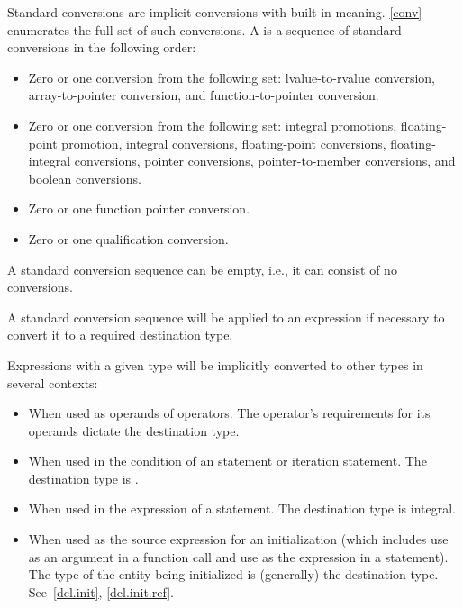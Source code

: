 \pnum
{}%
%
Standard conversions are implicit conversions with built-in meaning.
\ref{conv} enumerates the full set of such conversions. A
 is a sequence of standard
conversions in the following order:
\begin{itemize}
\item Zero or one conversion from the following set: lvalue-to-rvalue
conversion, array-to-pointer conversion, and function-to-pointer
conversion.

\item Zero or one conversion from the following set: integral
promotions, floating-point promotion, integral conversions, floating-point
conversions, floating-integral conversions, pointer conversions,
pointer-to-member conversions, and boolean conversions.

\item Zero or one function pointer conversion.

\item Zero or one qualification conversion.
\end{itemize}

\begin{note}
A standard conversion sequence can be empty, i.e., it can consist of no
conversions.
\end{note}
A standard conversion sequence will be applied to
an expression if necessary to convert it to a required destination type.

\pnum
\begin{note}
Expressions with a given type will be implicitly converted to other
types in several contexts:
\begin{itemize}
\item When used as operands of operators. The operator's requirements
for its operands dictate the destination type.

\item When used in the condition of an  statement or
iteration statement. The destination type is
.

\item When used in the expression of a  statement.
The destination type is integral.

\item When used as the source expression for an initialization (which
includes use as an argument in a function call and use as the expression
in a  statement). The type of the entity being initialized
is (generally) the destination type.
See~\ref{dcl.init}, \ref{dcl.init.ref}.
\end{itemize}
\end{note}

